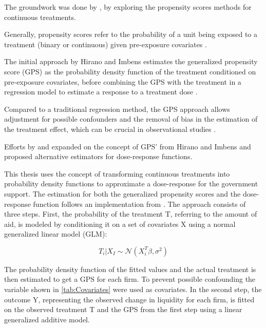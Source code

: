 The groundwork was done by \parencite{hirano_propensity_2004}, by exploring the propensity scores methods for continuous treatments. 

Generally, propensity scores refer to the probability of a unit being exposed to a treatment (binary or continuous) given pre-exposure covariates \parencite{rosenbaum_central_1983}. 

The initial approach by Hirano and Imbens estimates the generalized propensity score (GPS) as the probability density function of the treatment conditioned on pre-exposure covariates, before combining the GPS with the treatment in a regression model to estimate a response to a treatment dose \parencite{hirano_propensity_2004}.

Compared to a traditional regression method, the GPS approach allows adjustment for possible confounders and the removal of bias in the estimation of the treatment effect, which can be crucial in observational studies \parencite{wu_matching_2021,moodie_estimation_2012}. 

Efforts by \parencite{moodie_estimation_2012} and \parencite{galagate_causal_2016} expanded on the concept of GPS' from Hirano and Imbens and proposed alternative estimators for dose-response functions.



This thesis uses the concept of transforming continuous treatments into probability density functions to approximate a dose-response for the government support. The estimation for both the generalized propensity scores and the dose-response function follows an implementation from \parencite{kobrosly_causal-curve_2020}. 
The approach consists of three steps. First, the probability of the treatment T, referring to the amount of aid, is modeled by conditioning it on a set of covariates X using a normal generalized linear model (GLM):


\begin{equation}
    T_{i}|X_{I}\sim \mathcal{N} (X^{T}_{i}\beta,\sigma^{2})
    \label{eqn:densit}
\end{equation}

The probability density function of the fitted values and the actual treatment is then estimated to get a GPS for each firm. To prevent possible confounding the variable shown in \ref{tab:Covariates} were used as covariates. 
In the second step, the outcome Y, representing the observed change in liquidity for each firm, is fitted on the observed treatment T and the GPS from the first step using a linear generalized additive model. 

